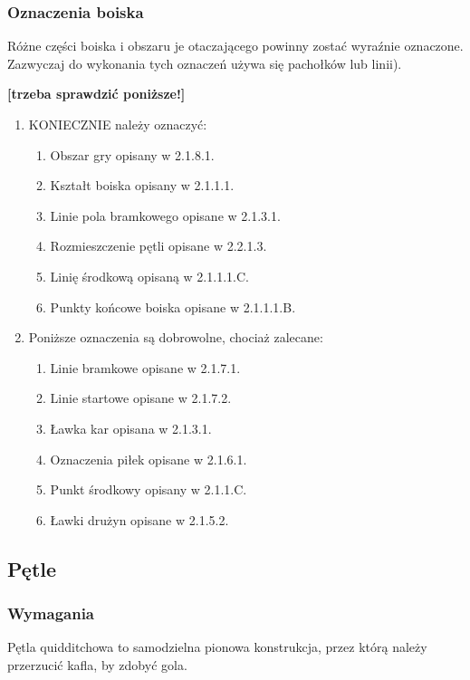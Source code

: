 \documentclass[12pt]{article}
\begin{document}
\subsubsection{Oznaczenia boiska}

Różne części boiska i obszaru je otaczającego powinny zostać wyraźnie
oznaczone. Zazwyczaj do wykonania tych oznaczeń używa się pachołków lub
linii).

\textbf{[trzeba sprawdzić poniższe!]}

\begin{enumerate}
	\item
	      KONIECZNIE należy oznaczyć:

	      \begin{enumerate}
		      \item Obszar gry opisany w 2.1.8.1.
		      \item Kształt boiska opisany w 2.1.1.1.
		      \item Linie pola bramkowego opisane w 2.1.3.1.
		      \item Rozmieszczenie pętli opisane w 2.2.1.3.
		      \item Linię środkową opisaną w 2.1.1.1.C.
		      \item Punkty końcowe boiska opisane w 2.1.1.1.B.
	      \end{enumerate}

	\item Poniższe oznaczenia są dobrowolne, chociaż zalecane:
	      \begin{enumerate}
		      \item Linie bramkowe opisane w 2.1.7.1.
		      \item Linie startowe opisane w 2.1.7.2.
		      \item Ławka kar opisana w 2.1.3.1.
		      \item Oznaczenia piłek opisane w 2.1.6.1.
		      \item Punkt środkowy opisany w 2.1.1.C.
		      \item Ławki drużyn opisane w 2.1.5.2.
	      \end{enumerate}
\end{enumerate}

\subsection{Pętle}

\subsubsection{Wymagania}
Pętla quidditchowa to samodzielna pionowa
konstrukcja, przez którą należy przerzucić kafla, by zdobyć gola.
\end{document}
